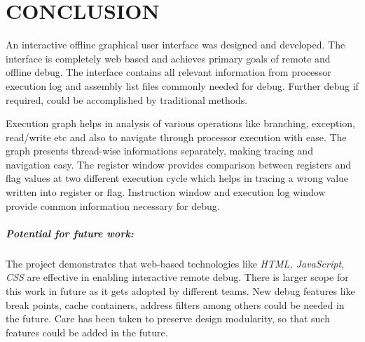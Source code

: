 \chapter{CONCLUSION}
\label{chap:GUI_conclusion}

An interactive offline graphical user interface was designed and developed. The interface is completely web based and achieves primary goals of remote and offline debug. The interface contains all relevant information from processor execution log and assembly list files commonly needed for debug. Further debug if required, could be accomplished by traditional methods.

Execution graph helps in analysis of various operations like branching, exception, read/write etc and also to navigate through processor execution with ease. The graph presents thread-wise informations separately, making tracing and navigation easy. The register window provides comparison between registers and flag values at two different execution cycle which helps in tracing a wrong value written into register or flag. Instruction window and execution log window provide common information necessary for debug.

\paragraph{Potential for future work:} The project demonstrates that web-based technologies like {\it HTML, JavaScript, CSS} are effective in enabling interactive remote debug. There is larger scope for this work in future as it gets adopted by different teams. New debug features like break points, cache containers, address filters among others could be needed in the future. Care has been taken to preserve design modularity, so that such features could  be added in the future.

